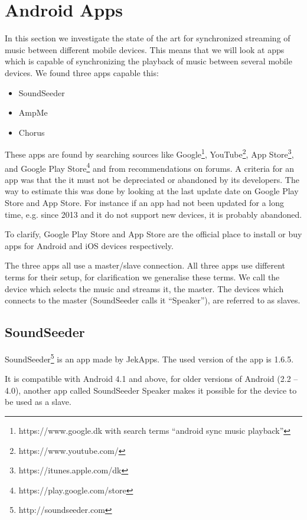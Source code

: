 \section{Android Apps}\label{sec:sota_apps}
In this section we investigate the state of the art for synchronized streaming of music between different mobile devices.
This means that we will look at apps which is capable of synchronizing the playback of music between several mobile devices.
We found three apps capable this:
\begin{itemize}
    \item SoundSeeder
    \item AmpMe
    \item Chorus
\end{itemize}

These apps are found by searching sources like Google\footnote{https://www.google.dk with search terms ``android sync music playback''}, YouTube\footnote{https://www.youtube.com/}, App Store\footnote{https://itunes.apple.com/dk}, and Google Play Store\footnote{https://play.google.com/store} and from recommendations on forums. 
A criteria for an app was that the it must not be depreciated or abandoned by its developers.
The way to estimate this was done by looking at the last update date on Google Play Store and App Store.
For instance if an app had not been updated for a long time, e.g. since 2013 and it do not support new devices, it is probably abandoned.

To clarify, Google Play Store and App Store are the official place to install or buy apps for Android and iOS devices respectively.

The three apps all use a master/slave connection.
All three apps use different terms for their setup, for clarification we generalise these terms. 
We call the device which selects the music and streams it, the master.
The devices which connects to the master (SoundSeeder calls it ``Speaker''), are referred to as slaves.

\subsection{SoundSeeder}\label{subsec:soundseeder}
SoundSeeder\footnote{http://soundseeder.com} is an app made by JekApps. 
The used version of the app is 1.6.5.

It is compatible with Android 4.1 and above, for older versions of Android (2.2 -- 4.0),
another app called SoundSeeder Speaker makes it possible for the device to be used as a slave.

